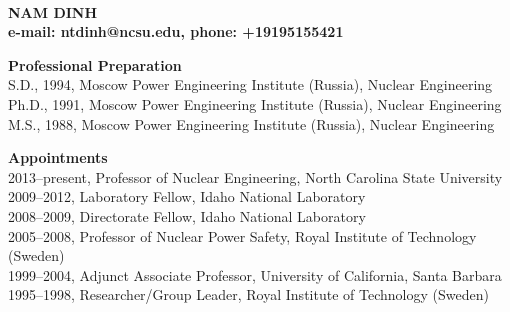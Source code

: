 \documentclass[11pt,letterpaper,english]{article}
\begin{document}
\setlength{\parindent}{0in} %

\pagestyle{fancy}   \renewcommand{%
\headrulewidth}{0.0pt}

\\
{\bf NAM DINH}\\
{\bf e-mail: ntdinh@ncsu.edu, phone: +19195155421} \smallskip

\begin{flushleft} {\bf Professional Preparation}
{\parindent 16pt
   ~\\
   S.D., 1994, Moscow Power Engineering Institute (Russia), Nuclear Engineering \\
   Ph.D., 1991, Moscow Power Engineering Institute (Russia), Nuclear Engineering \\
   M.S., 1988, Moscow Power Engineering Institute (Russia), Nuclear Engineering \\
}

\vspace{.04in}
{\bf Appointments}
{\parindent 16pt
  ~\\
  2013--present, Professor of Nuclear Engineering, North Carolina State University \\
  2009--2012, Laboratory Fellow, Idaho National Laboratory\\
  2008--2009, Directorate Fellow, Idaho National Laboratory\\
  2005--2008, Professor of Nuclear Power Safety, Royal Institute of Technology (Sweden)\\
  1999--2004, Adjunct Associate Professor, University of California, Santa Barbara \\
  1995--1998, Researcher/Group Leader, Royal Institute of Technology (Sweden)
}


\end{flushleft}
\end{document}
